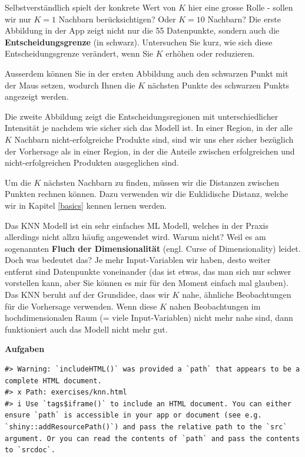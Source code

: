 \documentclass[
]{book}
\begin{document}
Selbstverständlich spielt der konkrete Wert von \(K\) hier eine grosse Rolle - sollen wir nur \(K=1\) Nachbarn berücksichtigen? Oder \(K=10\) Nachbarn? Die erste Abbildung in der App zeigt nicht nur die 55 Datenpunkte, sondern auch die \textbf{Entscheidungsgrenze} (in schwarz). Untersuchen Sie kurz, wie sich diese Entscheidungsgrenze verändert, wenn Sie \(K\) erhöhen oder reduzieren.

Ausserdem können Sie in der ersten Abbildung auch den schwarzen Punkt mit der Maus setzen, wodurch Ihnen die \(K\) nächsten Punkte des schwarzen Punkts angezeigt werden.

Die zweite Abbildung zeigt die Entscheidungsregionen mit unterschiedlicher Intensität je nachdem wie sicher sich das Modell ist. In einer Region, in der alle \(K\) Nachbarn nicht-erfolgreiche Produkte sind, sind wir uns eher sicher bezüglich der Vorhersage als in einer Region, in der die Anteile zwischen erfolgreichen und nicht-erfolgreichen Produkten ausgeglichen sind.

Um die \(K\) nächsten Nachbarn zu finden, müssen wir die Distanzen zwischen Punkten rechnen können. Dazu verwenden wir die Euklidische Distanz, welche wir in Kapitel \ref{basics} kennen lernen werden.

Das KNN Modell ist ein sehr einfaches ML Modell, welches in der Praxis allerdings nicht allzu häufig angewendet wird. Warum nicht? Weil es am sogenannten \textbf{Fluch der Dimensionalität} (engl. Curse of Dimensionality) leidet. Doch was bedeutet das? Je mehr Input-Variablen wir haben, desto weiter entfernt sind Datenpunkte voneinander (das ist etwas, das man sich nur schwer vorstellen kann, aber Sie können es mir für den Moment einfach mal glauben). Das KNN beruht auf der Grundidee, dass wir \(K\) nahe, ähnliche Beobachtungen für die Vorhersage verwenden. Wenn diese \(K\) nahen Beobachtungen im hochdimensionalen Raum (= viele Input-Variablen) nicht mehr nahe sind, dann funktioniert auch das Modell nicht mehr gut.

\textbf{Aufgaben}

\begin{verbatim}
#> Warning: `includeHTML()` was provided a `path` that appears to be a complete HTML document.
#> x Path: exercises/knn.html
#> i Use `tags$iframe()` to include an HTML document. You can either ensure `path` is accessible in your app or document (see e.g. `shiny::addResourcePath()`) and pass the relative path to the `src` argument. Or you can read the contents of `path` and pass the contents to `srcdoc`.
\end{verbatim}
\end{document}
